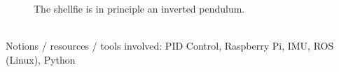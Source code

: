 {\begin{minipage}{\linewidth}
\begin{minipage}{0.45\linewidth}
\begin{figure}[H]
      \caption{The shellfie is in principle an inverted pendulum.}
      \label{fig:shellfie_schem}
    \end{figure}
  \end{minipage}
\end{minipage}
}\\

Notions / resources / tools involved: PID Control, Raspberry Pi, IMU, ROS (Linux), Python
